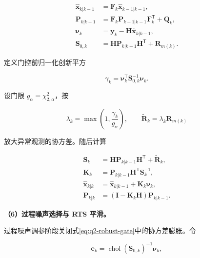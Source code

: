 \begin{equation}
\begin{aligned}
\widehat{\mathbf x}_{k|k-1}
&=\mathbf F_k\widehat{\mathbf x}_{k-1|k-1},\\
\mathbf P_{k|k-1}
&=\mathbf F_k\mathbf P_{k-1|k-1}\mathbf F_k^\mathsf T+\mathbf Q_k,\\
\boldsymbol\nu_k
&=\mathbf y_k-\mathbf H\widehat{\mathbf x}_{k|k-1},\\
\mathbf S_{0,k}
&=\mathbf H\mathbf P_{k|k-1}\mathbf H^\mathsf T+\mathbf R_{m(k)}.
\end{aligned}
\label{eq:q2-kalman-prediction}
\end{equation}

定义门控前归一化创新平方

\begin{equation}
\gamma_k=\boldsymbol\nu_k^\mathsf T
\mathbf S_{0,k}^{-1}\boldsymbol\nu_k.
\label{eq:q2-nis}
\end{equation}

设门限 \(g_\alpha=\chi^2_{2,\alpha}\)，按

\begin{equation}
\lambda_k=\max\!\left(1,\frac{\gamma_k}{g_\alpha}\right),
\qquad
\widetilde{\mathbf R}_k=\lambda_k\mathbf R_{m(k)}
\label{eq:q2-robust-gate}
\end{equation}

放大异常观测的协方差。随后计算

\begin{equation}
\begin{aligned}
\mathbf S_k
&=\mathbf H\mathbf P_{k|k-1}\mathbf H^\mathsf T
+\widetilde{\mathbf R}_k,\\
\mathbf K_k
&=\mathbf P_{k|k-1}\mathbf H^\mathsf T\mathbf S_k^{-1},\\
\widehat{\mathbf x}_{k|k}
&=\widehat{\mathbf x}_{k|k-1}+\mathbf K_k\boldsymbol\nu_k,\\
\mathbf P_{k|k}
&=(\mathbf I-\mathbf K_k\mathbf H)\mathbf P_{k|k-1}.
\end{aligned}
\label{eq:q2-kalman-update}
\end{equation}

\noindent\textbf{（6）过程噪声选择与 RTS 平滑。}

过程噪声调参阶段关闭式\eqref{eq:q2-robust-gate}中的协方差膨胀。令

\begin{equation}
\mathbf e_k=
\operatorname{chol}(\mathbf S_{0,k})^{-1}\boldsymbol\nu_k,
\label{eq:q2-whitened-innovation}
\end{equation}


